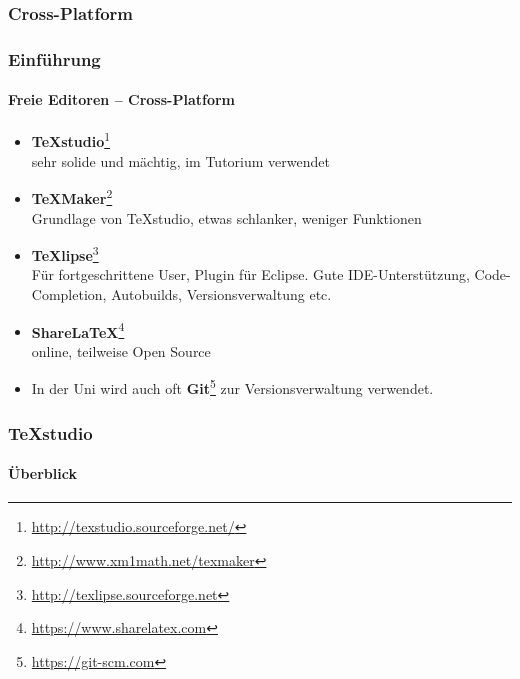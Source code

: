 \subsubsection{Cross-Platform}
\begin{frame}
\frametitle{Einführung}
\framesubtitle{Freie Editoren -- Cross-Platform}
\begin{itemize}
  \item \textbf{TeXstudio}\footnote{\url{http://texstudio.sourceforge.net/}}\\
  sehr solide und mächtig, im Tutorium verwendet
  \item \textbf{TeXMaker}\footnote{\url{http://www.xm1math.net/texmaker}}\\
   Grundlage von TeXstudio, etwas schlanker, weniger Funktionen
  \item \textbf{TeXlipse}\footnote{\url{http://texlipse.sourceforge.net}}\\ Für fortgeschrittene User, Plugin für
  Eclipse. Gute IDE-Unterstützung, Code-Completion, Autobuilds, Versionsverwaltung etc.
  \item \textbf{ShareLaTeX}\footnote{\url{https://www.sharelatex.com}}\\
  online, teilweise Open Source
  \item In der Uni wird auch oft \textbf{Git}\footnote{\url{https://git-scm.com}} zur Versionsverwaltung verwendet.
\end{itemize}
\end{frame}




\begin{frame}
\frametitle{TeXstudio}
\framesubtitle{\"Uberblick}
\end{frame}




